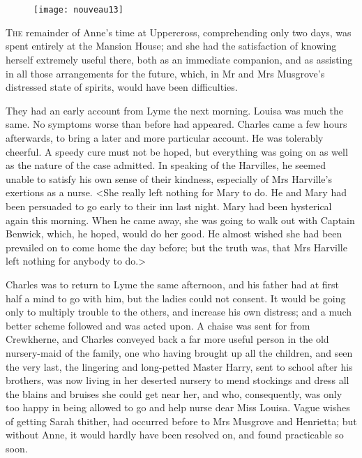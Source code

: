 \chapter[Chapter \thechapter]{}

\begin{figure}[t!]
\centering
\texttt{[image: nouveau13]}
\end{figure}

\lettrine[lraise=0.3]{T}{he} remainder of Anne's time at Uppercross, comprehending only two days, was spent entirely at the Mansion House; and she had the satisfaction of knowing herself extremely useful there, both as an immediate companion, and as assisting in all those arrangements for the future, which, in Mr and Mrs Musgrove's distressed state of spirits, would have been difficulties.

They had an early account from Lyme the next morning. Louisa was much the same. No symptoms worse than before had appeared. Charles came a few hours afterwards, to bring a later and more particular account. He was tolerably cheerful. A speedy cure must not be hoped, but everything was going on as well as the nature of the case admitted. In speaking of the Harvilles, he seemed unable to satisfy his own sense of their kindness, especially of Mrs Harville's exertions as a nurse. <She really left nothing for Mary to do. He and Mary had been persuaded to go early to their inn last night. Mary had been hysterical again this morning. When he came away, she was going to walk out with Captain Benwick, which, he hoped, would do her good. He almost wished she had been prevailed on to come home the day before; but the truth was, that Mrs Harville left nothing for anybody to do.>

Charles was to return to Lyme the same afternoon, and his father had at first half a mind to go with him, but the ladies could not consent. It would be going only to multiply trouble to the others, and increase his own distress; and a much better scheme followed and was acted upon. A chaise was sent for from Crewkherne, and Charles conveyed back a far more useful person in the old nursery-maid of the family, one who having brought up all the children, and seen the very last, the lingering and long-petted Master Harry, sent to school after his brothers, was now living in her deserted nursery to mend stockings and dress all the blains and bruises she could get near her, and who, consequently, was only too happy in being allowed to go and help nurse dear Miss Louisa. Vague wishes of getting Sarah thither, had occurred before to Mrs Musgrove and Henrietta; but without Anne, it would hardly have been resolved on, and found practicable so soon.


